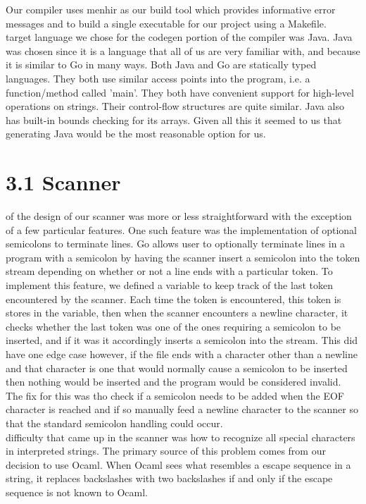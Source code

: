 \documentclass{article}
\begin{document}
Our compiler uses menhir as our build tool which provides informative error messages and to build a single executable for our project using a Makefile.\\
 target language we chose for the codegen portion of the compiler was Java.
Java was chosen since it is a language that all of us are very familiar with, and because it is similar to Go in many ways.
Both Java and Go are statically typed languages.
They both use similar access points into the program, i.e. a function/method called 'main'.
They both have convenient support for high-level operations on strings.
Their control-flow structures are quite similar.
Java also has built-in bounds checking for its arrays.
Given all this it seemed to us that generating Java would be the most reasonable option for us.
\section*{3.1 Scanner}\mbox{}
 of the  design of our scanner was more or less straightforward with the exception of a few particular features.
One such feature was the implementation of optional semicolons to terminate lines.
Go allows user to optionally terminate lines in a program with a semicolon by having the scanner insert a semicolon into the token stream depending on whether or not a line ends with a particular token.
To implement this feature, we defined a variable to keep track of the last token encountered by the scanner.
Each time the token is encountered, this token is stores in the variable, then when the scanner encounters a newline character, it checks whether the last token was one of the ones requiring a semicolon to be inserted, and if it was it accordingly inserts a semicolon into the stream.
This did have one edge case however, if the file ends with a character other than a newline and that character is one that would normally cause a semicolon to be inserted then nothing would be inserted and the program would be considered invalid.
The fix for this was tho check if a semicolon needs to be added when the EOF character is reached and if so manually feed a newline character to the scanner so that the standard semicolon handling could occur.
\\
 difficulty that came up in the scanner was how to recognize all special characters in interpreted strings.
The primary source of this problem comes from our decision to use Ocaml.
When Ocaml sees what resembles a escape sequence in a string, it replaces backslashes with two backslashes if and only if the escape sequence is not known to Ocaml.
\end{document}
